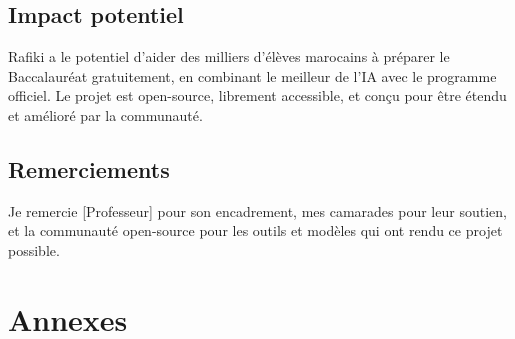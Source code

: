 \documentclass[12pt,a4paper]{report}
\begin{document}
\section{Impact potentiel}
Rafiki a le potentiel d'aider des milliers d'élèves marocains à préparer le Baccalauréat gratuitement, en combinant le meilleur de l'IA avec le programme officiel. Le projet est open-source, librement accessible, et conçu pour être étendu et amélioré par la communauté.

\section*{Remerciements}
Je remercie [Professeur] pour son encadrement, mes camarades pour leur soutien, et la communauté open-source pour les outils et modèles qui ont rendu ce projet possible.

\appendix
\chapter{Annexes}
\end{document}
